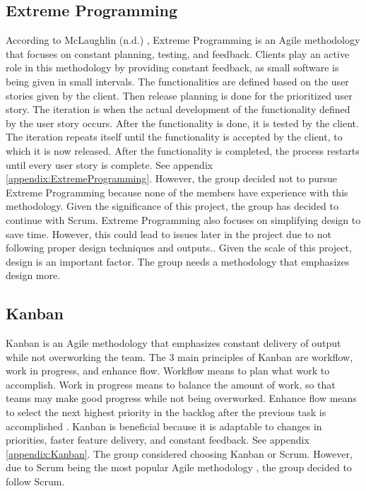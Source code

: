 \subsection{Extreme Programming}
According to McLaughlin (n.d.) \nocite{ref:ExtremeProgramming}, Extreme Programming is an Agile methodology that focuses on constant planning, testing, and feedback. Clients play an active role in this methodology by providing constant feedback, as small software is being given in small intervals. The functionalities are defined based on the user stories given by the client. Then release planning is done for the prioritized user story. The iteration is when the actual development of the functionality defined by the user story occurs. After the functionality is done, it is tested by the client. The iteration repeats itself until the functionality is accepted by the client, to which it is now released. After the functionality is completed, the process restarts until every user story is complete. See appendix \ref{appendix:ExtremeProgramming}. However, the group decided not to pursue Extreme Programming because none of the members have experience with this methodology. Given the significance of this project, the group has decided to continue with Scrum. Extreme Programming also focuses on simplifying design to save time. However, this could lead to issues later in the project due to not following proper design techniques and outputs.\cite{ref:ExtremeProgrammingDisadvantage}. Given the scale of this project, design is an important factor. The group needs a methodology that emphasizes design more.

\subsection{Kanban}
Kanban is an Agile methodology that emphasizes constant delivery of output while not overworking the team. The 3 main principles of Kanban are workflow, work in progress, and enhance flow. Workflow means to plan what work to accomplish. Work in progress means to balance the amount of work, so that teams may make good progress while not being overworked. Enhance flow means to select the next highest priority in the backlog after the previous task is accomplished \cite{ref:ExtremeProgramming}. Kanban is beneficial because it is adaptable to changes in priorities, faster feature delivery, and constant feedback. See appendix \ref{appendix:Kanban}. The group considered choosing Kanban or Scrum. However, due to Scrum being the most popular Agile methodology \cite{ref:ScrumPopular}, the group decided to follow Scrum.

